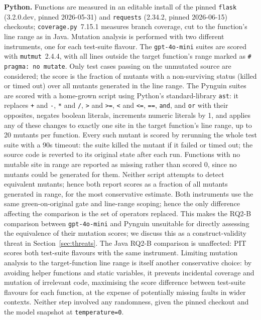 \textbf{Python.} Functions are measured in an editable install of the pinned
\texttt{flask} (3.2.0.dev, pinned 2026-05-31) and \texttt{requests} (2.34.2, pinned
2026-06-15) checkouts; \texttt{coverage.py}~7.15.1 measures branch coverage, cut to the
function's line range as in Java. Mutation analysis is performed with two different
instruments, one for each test-suite flavour. The \texttt{gpt-4o-mini} suites are scored
with \texttt{mutmut}~2.4.4, with all lines outside the target function's range marked as
\texttt{\# pragma: no mutate}. Only test cases passing on the unmutated source are
considered; the score is the fraction of mutants with a non-surviving status (killed or
timed out) over all mutants generated in the line range. The Pynguin suites are scored
with a home-grown script using Python's standard-library \texttt{ast}: it replaces
\texttt{+} and \texttt{-}, \texttt{*} and \texttt{/}, \texttt{>} and \texttt{>=},
\texttt{<} and \texttt{<=}, \texttt{==}, \texttt{and}, and \texttt{or} with their opposites,
negates boolean literals,
increments numeric literals by 1, and applies any of these changes to exactly one site in
the target function's line range, up to 20 mutants per function. Every such mutant is
scored by rerunning the whole test suite with a 90s timeout: the suite killed the mutant
if it failed or timed out; the source code is reverted to its original state after each
run. Functions with no mutable site in range are reported as missing rather than scored 0,
since no mutants could be generated for them. Neither script attempts to detect equivalent
mutants; hence both report scores as a fraction of all mutants generated in range, for the
most conservative estimate. Both instruments use the same green-on-original gate and
line-range scoping; hence the only difference affecting the comparison is the set of
operators replaced. This makes the RQ2-B comparison between \texttt{gpt-4o-mini} and
Pynguin unsuitable for directly assessing the equivalence of their mutation scores; we
discuss this as a construct-validity threat in Section~\ref{sec:threats}. The Java RQ2-B
comparison is unaffected: PIT scores both test-suite flavours with the same instrument.
Limiting mutation analysis to the target-function line range is itself another
conservative choice: by avoiding helper functions and static variables, it prevents
incidental coverage and mutation of irrelevant code, maximising the score difference
between test-suite flavours for each function, at the expense of potentially missing
faults in wider contexts. Neither step involved any randomness, given the pinned checkout
and the model snapshot at \texttt{temperature=0}.

